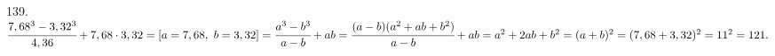 139. $\cfrac{7,68^3-3,32^3}{4,36}+7,68\cdot3,32=[a=7,68,\ b=3,32]=\cfrac{a^3-b^3}{a-b}+ab=\cfrac{(a-b)(a^2+ab+b^2)}{a-b}+ab=a^2+2ab+b^2=(a+b)^2=(7,68+3,32)^2=11^2=121.$\\
